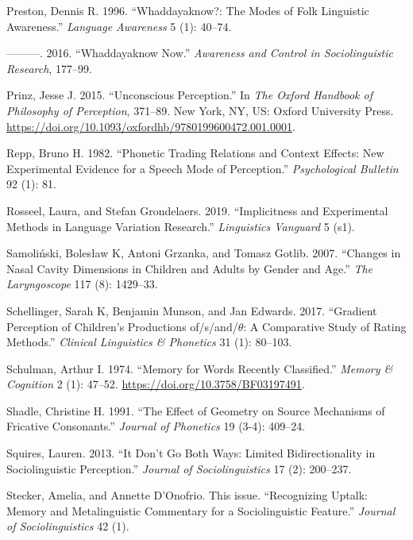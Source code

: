 \documentclass[
  letterpaper,
  DIV=11,
  numbers=noendperiod]{scrartcl}
\newlength{\cslhangindent}
\newenvironment{CSLReferences}[2] %
 {\begin{list}{}{%
  \setlength{\itemindent}{0pt}
  \setlength{\leftmargin}{0pt}
  \setlength{\parsep}{0pt}
  \ifodd #1
   \setlength{\leftmargin}{\cslhangindent}
   \setlength{\itemindent}{-1\cslhangindent}
  \fi
  \setlength{\itemsep}{#2\baselineskip}}}
 {\end{list}}
\begin{document}
\begin{CSLReferences}{1}{0}
Preston, Dennis R. 1996. {``Whaddayaknow?: The Modes of Folk Linguistic
Awareness.''} \emph{Language Awareness} 5 (1): 40--74.

---------. 2016. {``Whaddayaknow Now.''} \emph{Awareness and Control in
Sociolinguistic Research}, 177--99.

Prinz, Jesse J. 2015. {``Unconscious Perception.''} In \emph{The
{Oxford} Handbook of Philosophy of Perception}, 371--89. New York, NY,
US: Oxford University Press.
\url{https://doi.org/10.1093/oxfordhb/9780199600472.001.0001}.

Repp, Bruno H. 1982. {``Phonetic Trading Relations and Context Effects:
New Experimental Evidence for a Speech Mode of Perception.''}
\emph{Psychological Bulletin} 92 (1): 81.

Rosseel, Laura, and Stefan Grondelaers. 2019. {``Implicitness and
Experimental Methods in Language Variation Research.''}
\emph{Linguistics Vanguard} 5 (s1).

Samoliński, Bolesław K, Antoni Grzanka, and Tomasz Gotlib. 2007.
{``Changes in Nasal Cavity Dimensions in Children and Adults by Gender
and Age.''} \emph{The Laryngoscope} 117 (8): 1429--33.

Schellinger, Sarah K, Benjamin Munson, and Jan Edwards. 2017.
{``Gradient Perception of Children's Productions of/s/and/\(\theta\): A
Comparative Study of Rating Methods.''} \emph{Clinical Linguistics \&
Phonetics} 31 (1): 80--103.

Schulman, Arthur I. 1974. {``Memory for Words Recently Classified.''}
\emph{Memory \& Cognition} 2 (1): 47--52.
\url{https://doi.org/10.3758/BF03197491}.

Shadle, Christine H. 1991. {``The Effect of Geometry on Source
Mechanisms of Fricative Consonants.''} \emph{Journal of Phonetics} 19
(3-4): 409--24.

Squires, Lauren. 2013. {``It Don't Go Both Ways: Limited
Bidirectionality in Sociolinguistic Perception.''} \emph{Journal of
Sociolinguistics} 17 (2): 200--237.

Stecker, Amelia, and Annette D'Onofrio. This issue. {``Recognizing
Uptalk: Memory and Metalinguistic Commentary for a Sociolinguistic
Feature.''} \emph{Journal of Sociolinguistics} 42 (1).


\end{CSLReferences}
\end{document}
